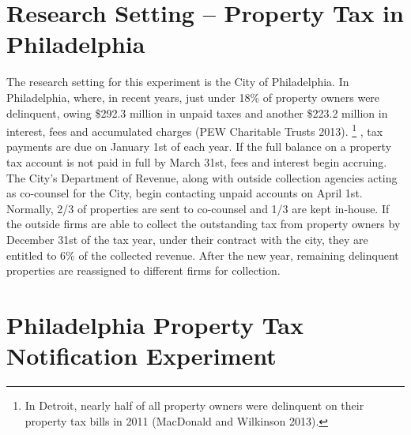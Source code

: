 \documentclass[12pt,titlepage]{article}
\begin{document}
\section{Research Setting -- Property Tax in Philadelphia}

The research setting for this experiment is the City of
Philadelphia. In Philadelphia, where, in recent years, just under
18\% of property owners were delinquent, owing 
\$292.3 million in unpaid taxes and another \$223.2 million in interest,
fees and accumulated charges (PEW Charitable Trusts 2013).
\footnote{
	In Detroit, nearly half of all property owners were delinquent
    on their property tax bills in 2011 (MacDonald and Wilkinson 2013).
}
, tax payments are due on January 1st of each year. If the full balance on a
property tax account is not paid in full by March 31st, fees and interest
begin accruing. The City’s Department of Revenue, along with outside
collection agencies acting as co-counsel for the City, begin contacting
unpaid accounts on April 1st. Normally, 2/3 of properties are sent to
co-counsel and 1/3 are kept in-house. If the outside firms are able to
collect the outstanding tax from property owners by December 31st of the
tax year, under their contract with the city, they are entitled to 6\% of
the collected revenue. After the new year, remaining delinquent properties
are reassigned to different firms for collection.

\section{Philadelphia Property Tax Notification Experiment}
\end{document}
